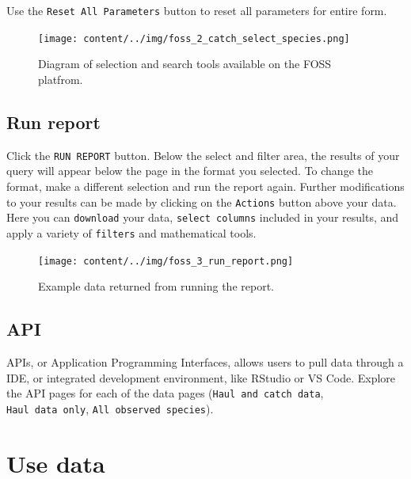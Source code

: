 \documentclass[
  letterpaper,
  oneside,
  open=any]{scrbook}
\begin{document}
Use the \texttt{Reset\ All\ Parameters} button to reset all parameters
for entire form.

\begin{figure}[H]

{\centering \texttt{[image: content/../img/foss\_2\_catch\_select\_species.png]}

}

\caption{Diagram of selection and search tools available on the FOSS
platfrom.}

\end{figure}%

\section{Run report}\label{run-report}

Click the \texttt{RUN\ REPORT} button. Below the select and filter area,
the results of your query will appear below the page in the format you
selected. To change the format, make a different selection and run the
report again. Further modifications to your results can be made by
clicking on the \texttt{Actions} button above your data. Here you can
\texttt{download} your data, \texttt{select\ columns} included in your
results, and apply a variety of \texttt{filters} and mathematical tools.

\begin{figure}[H]

{\centering \texttt{[image: content/../img/foss\_3\_run\_report.png]}

}

\caption{Example data returned from running the report.}

\end{figure}%

\section{API}\label{api}

APIs, or Application Programming Interfaces, allows users to pull data
through a IDE, or integrated development environment, like RStudio or VS
Code. Explore the API pages for each of the data pages
(\texttt{Haul\ and\ catch\ data}, \texttt{Haul\ data\ only},
\texttt{All\ observed\ species}).

\chapter{Use data}\label{use-data}
\end{document}
